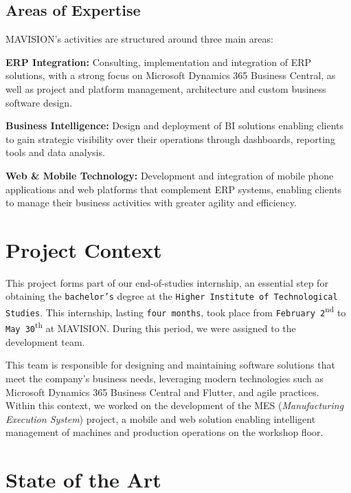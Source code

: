 \subsection{Areas of Expertise}
 
MAVISION's activities are structured around three main areas:
 
\textbf{ERP Integration:} Consulting, implementation and integration of ERP solutions,
with a strong focus on Microsoft Dynamics 365 Business Central, as well as project and
platform management, architecture and custom business software design.
 
\textbf{Business Intelligence:} Design and deployment of BI solutions enabling clients
to gain strategic visibility over their operations through dashboards, reporting tools
and data analysis.
 
\textbf{Web \& Mobile Technology:} Development and integration of mobile phone
applications and web platforms that complement ERP systems, enabling clients to manage
their business activities with greater agility and efficiency.


\section{Project Context}

This project forms part of our end-of-studies internship, an essential step for
obtaining the \texttt{bachelor's} degree at the
\texttt{Higher Institute of Technological Studies}.
This internship, lasting \texttt{four months}, took place from
\texttt{February 2}\textsuperscript{nd} to \texttt{May 30}\textsuperscript{th} at MAVISION. During
this period, we were assigned to the development team.

This team is responsible for designing and maintaining software solutions that meet
the company's business needs, leveraging modern technologies such as Microsoft
Dynamics 365 Business Central and Flutter, and agile practices. Within this context,
we worked on the development of the MES (\textit{Manufacturing Execution System})
project, a mobile and web solution enabling intelligent management of machines and
production operations on the workshop floor.

\section{State of the Art}

